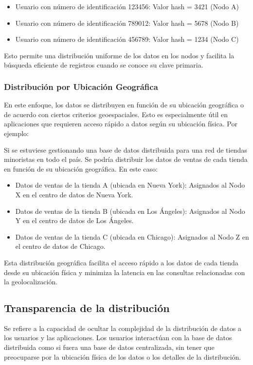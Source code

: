 \begin{itemize}
	\item Usuario con número de identificación 123456: Valor hash = 3421 (Nodo A)
	\item Usuario con número de identificación 789012: Valor hash = 5678 (Nodo B)
	\item Usuario con número de identificación 456789: Valor hash = 1234 (Nodo C)
\end{itemize}
Esto permite una distribución uniforme de los datos en los nodos y facilita la búsqueda eficiente de registros cuando se conoce su clave primaria.

\subsubsection{Distribución por Ubicación Geográfica}
\noindent
En este enfoque, los datos se distribuyen en función de su ubicación geográfica o de acuerdo con ciertos criterios geoespaciales. Esto es especialmente útil en aplicaciones que requieren acceso rápido a datos según su ubicación física. Por ejemplo:

Si se estuviese gestionando una base de datos distribuida para una red de tiendas minoristas en todo el país. Se podría distribuir los datos de ventas de cada tienda en función de su ubicación geográfica. En este caso:
\begin{itemize}
	\item Datos de ventas de la tienda A (ubicada en Nueva York): Asignados al Nodo X en el centro de datos de Nueva York.
	\item Datos de ventas de la tienda B (ubicada en Los Ángeles): Asignados al Nodo Y en el centro de datos de Los Ángeles.
	\item Datos de ventas de la tienda C (ubicada en Chicago): Asignados al Nodo Z en el centro de datos de Chicago.
\end{itemize}
Esta distribución geográfica facilita el acceso rápido a los datos de cada tienda desde su ubicación física y minimiza la latencia en las consultas relacionadas con la geolocalización.

\subsection{Transparencia de la distribución}
\noindent
Se refiere a la capacidad de ocultar la complejidad de la distribución de datos a los usuarios y las aplicaciones. Los usuarios interactúan con la base de datos distribuida como si fuera una base de datos centralizada, sin tener que preocuparse por la ubicación física de los datos o los detalles de la distribución.

